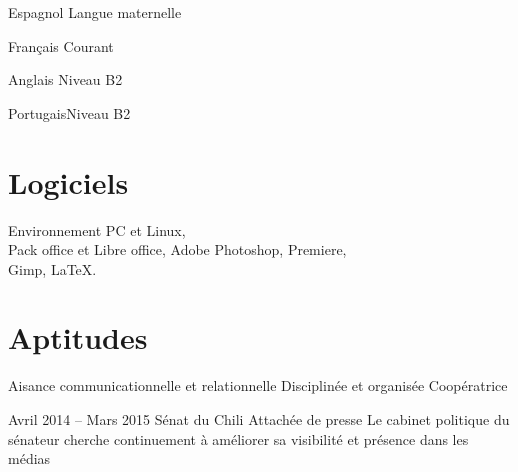 \documentclass[30pt, french]{tccv}
\begin{document}
\begin{upshape}
\begin{competence}
\begin{factlist}
\item{Espagnol} {Langue maternelle}	
\item{Français} {Courant}	
\item{Anglais}  {Niveau B2}	
\item{Portugais}{Niveau B2}
\end{factlist}

\vspace{0.5cm}
\section{Logiciels}
Environnement PC et Linux, \\
Pack office et Libre office,
Adobe Photoshop, Premiere, \\
Gimp,
\LaTeX.

\vspace{0.5cm}
\section{Aptitudes}
\begin{itemize}[leftmargin=13pt]
  \setlength\itemsep{-3pt} 
  \cvitem[\checkmark]  Aisance communicationnelle et relationnelle 
  \cvitem[\checkmark]  Disciplinée et organisée 
  \cvitem[\checkmark]  Coopératrice
\end{itemize}



\end{competence}




%
%


\begin{experience}



\setlength{\parskip}{0pt}
\item{\color{text} Avril 2014 -- Mars 2015}
     {Sénat du Chili}
     {Attachée de presse}
     \fontsize{9pt}{1em}\color{text}\bodyfontlight\upshape\selectfont
%
 Le cabinet politique du sénateur  cherche continuement à améliorer sa visibilité et présence dans les médias \\ 


\end{experience}
\end{upshape}
\end{document}
